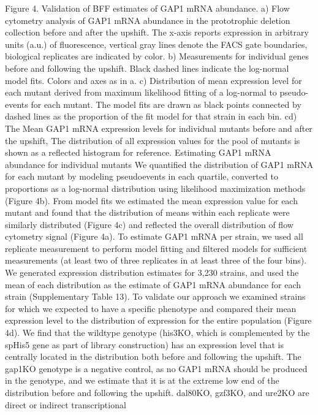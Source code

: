 Figure 4. Validation of BFF estimates of GAP1 mRNA  abundance.  a)
Flow cytometry analysis of GAP1 mRNA abundance in the prototrophic
deletion collection before and after the upshift.  The x-axis reports
expression in arbitrary units (a.u.) of fluorescence, vertical gray
lines denote the FACS gate boundaries, biological replicates are
indicated by color. b) Measurements for individual genes before and
following the upshift.  Black dashed lines indicate the log-normal
model fits.  Colors and axes as in a. c) Distribution of  mean
expression level for each mutant derived from maximum likelihood
fitting of a log-normal to pseudo-events for each mutant. The model
fits are drawn as black points connected by dashed lines as the
proportion of the fit model for that strain in each bin. cd) The Mean
GAP1 mRNA expression levels for individual mutants before and after
the upshift,   The distribution of all expression values for the pool
of mutants is shown as a reflected histogram for reference.
Estimating GAP1 mRNA abundance for individual  mutants We quantified
the distribution of GAP1 mRNA for each mutant by modeling
pseudoevents in each quartile, converted to proportions as a
log-normal distribution using likelihood maximization methods  (Figure
4b). From model fits we estimated the mean expression value for each
mutant and found that the distribution of means within each replicate
were similarly distributed (Figure 4c) and reflected the overall
distribution of flow cytometry signal (Figure 4a). To estimate GAP1
mRNA per strain, we used all replicate measurement to perform model
fitting and filtered models for sufficient measurements  (at least two
of three replicates in at least three of the four bins). We generated
expression distribution estimates for 3,230 strains, and used the mean
of each distribution as the estimate of GAP1 mRNA abundance for each
strain (Supplementary Table 13).  To validate our approach we
examined strains for which we expected to have a specific phenotype
and compared their mean expression level to the distribution of
expression for the entire population (Figure 4d). We find that the
wildtype genotype (his3KO, which is complemented by the spHis5 gene as
part of library construction) has an expression level that is
centrally located in the distribution both before and following the
upshift. The gap1KO genotype is a negative control, as no GAP1 mRNA
should be produced in the genotype, and we estimate that it is at the
extreme low end of the distribution before and following the upshift.
dal80KO, gzf3KO, and ure2KO are direct or indirect transcriptional
